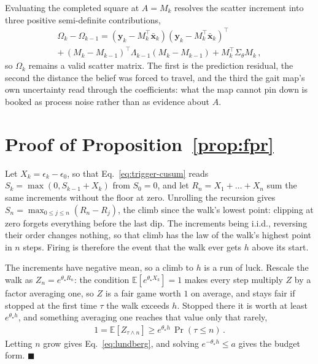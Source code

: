 \documentclass[lettersize,journal]{IEEEtran}
\newcommand{\E}{\mathbb{E}}
\begin{document}
Evaluating the completed square at $A = M_k$ resolves the scatter increment into three positive semi-definite contributions,
\begin{align*}
    \Omega_k - \Omega_{k-1} = (\mathbf{y}_k - M_k^\top \bar{\mathbf{x}}_k)(\mathbf{y}_k - M_k^\top \bar{\mathbf{x}}_k)^\top \qquad \\ + \, (M_k - M_{k-1})^\top \Lambda_{k-1} (M_k - M_{k-1}) + M_k^\top \Sigma_{\theta} M_k \, ,
\end{align*}
so $\Omega_k$ remains a valid scatter matrix. The first is the prediction residual, the second the distance the belief was forced to travel, and the third the gait map's own uncertainty read through the coefficients: what the map cannot pin down is booked as process noise rather than as evidence about $A$.

\section{Proof of Proposition~\ref{prop:fpr}}
\label{appx:fpr}

Let $X_k = \epsilon_k - \epsilon_0$, so that Eq.~\ref{eq:trigger-cusum} reads $S_k = \max(0, S_{k-1} + X_k)$ from $S_0 = 0$, and let $R_n = X_1 + \dots + X_n$ sum the same increments without the floor at zero.
Unrolling the recursion gives $S_n = \max_{0 \leq j \leq n}(R_n - R_j)$, the climb since the walk's lowest point: clipping at zero forgets everything before the last dip.
The increments being i.i.d., reversing their order changes nothing, so that climb has the law of the walk's highest point in $n$ steps.
Firing is therefore the event that the walk ever gets $h$ above its start.

The increments have negative mean, so a climb to $h$ is a run of luck.
Rescale the walk as $Z_n = e^{\theta_{\star} R_n}$: the condition $\E[e^{\theta_{\star} X_k}] = 1$ makes every step multiply $Z$ by a factor averaging one, so $Z$ is a fair game worth $1$ on average, and stays fair if stopped at the first time $\tau$ the walk exceeds $h$.
Stopped there it is worth at least $e^{\theta_{\star} h}$, and something averaging one reaches that value only that rarely,
\begin{align*}
    1 = \E[Z_{\tau \wedge n}] \geq e^{\theta_{\star} h}\,\Pr(\tau \leq n) \,.
\end{align*}
Letting $n$ grow gives Eq.~\ref{eq:lundberg}, and solving $e^{-\theta_{\star} h} \leq a$ gives the budget form. \hfill$\blacksquare$




\end{document}
